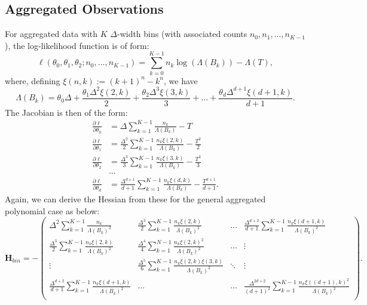 \documentclass[11pt,a4,twosided,singlespacing,titlepagenumber=on,numbers=endperiod]{scrreprt}
\numberwithin{equation}{chapter} %
\theoremstyle{remark}
\begin{document}
\subsection{Aggregated Observations}
For aggregated data with $K$ $\Delta$-width bins (with associated counts $n_0, n_1, ..., n_{K-1}$), the log-likelihood function is of form:
\begin{equation}\label{eq:poly_likeli_binned}
	\ell(\theta_0, \theta_1, \theta_2; n_0, ..., n_{K-1}) = \sum_{k=0}^{K-1} n_k \log(\Lambda(B_k)) - \Lambda(T),
\end{equation}
where, defining $\xi(n, k) := (k+1)^n - k^n$, we have
\begin{equation*}
		\Lambda(B_k) = \theta_0\Delta + \frac{\theta_1 \Delta^2 \xi(2, k)}{2} + \frac{\theta_2 \Delta^3 \xi(3, k)}{3} + \dots + \frac{\theta_d \Delta^{d+1} \xi(d+1, k)}{d+1}.
\end{equation*}
The Jacobian is then of the form:
\begin{equation*}
    \begin{aligned}
        \frac{\partial \ell}{\partial \theta_0} &= \Delta \sum_{k=1}^{K-1} \frac{n_k}{\Lambda(B_k)} - T \\
        \frac{\partial \ell}{\partial \theta_1} &= \frac{\Delta^2}{2} \sum_{k=1}^{K-1} \frac{n_k  \xi(2, k)}{\Lambda(B_k)} - \frac{T^2}{2} \\
        \frac{\partial \ell}{\partial \theta_2} &= \frac{\Delta^3}{3} \sum_{k=1}^{K-1} \frac{n_k \xi(3, k)}{\Lambda(B_k)} - \frac{T^3}{3} \\
        & \dots \\
        \frac{\partial \ell}{\partial \theta_{d}} &= \frac{\Delta^{d + 1}}{d + 1} \sum_{k=1}^{K-1} \frac{n_k \xi(d, k)}{\Lambda(B_k)} - \frac{T^{d + 1}}{d + 1}.
    \end{aligned}
\end{equation*}
Again, we can derive the Hessian from these for the general aggregated polynomial case as below:
\begin{equation*}
	\mathbf{H}_{bin} = -\begin{pmatrix}
		\Delta^2 \sum_{k=1}^{K-1} \frac{n_k}{\Lambda(B_k)^2}  & \frac{\Delta^3}{2} \sum_{k=1}^{K-1} \frac{n_k \xi(2, k)}{\Lambda(B_k)^2} & \dots & \frac{\Delta^{d+2}}{d+1} \sum_{k=1}^{K-1} \frac{n_k \xi(d+1, k)}{\Lambda(B_k)^2}\\
		\frac{\Delta^3}{2} \sum_{k=1}^{K-1} \frac{n_k \xi(2, k)}{\Lambda(B_k)^2} & \frac{\Delta^4}{4} \sum_{k=1}^{N-1} \frac{n_k \xi(2, k)^2}{\Lambda(B_k)^2} & \dots & \vdots \\
			\vdots & \frac{\Delta^5}{6} \sum_{k=1}^{K-1} \frac{n_k \xi(2, k)\xi(3, k)}{\Lambda(B_k)^2} & \ddots & \vdots\\
		\frac{\Delta^{d+2}}{d+1} \sum_{k=1}^{K-1} \frac{n_k \xi(d+1, k)}{\Lambda(B_k)^2} & \dots & \dots & \frac{\Delta^{2d+2}}{(d+1)^2} \sum_{k=1}^{K-1} \frac{n_k \xi((d+1), k)^2}{\Lambda(B_k)^2}\\
	\end{pmatrix}.
\end{equation*}
\end{document}
